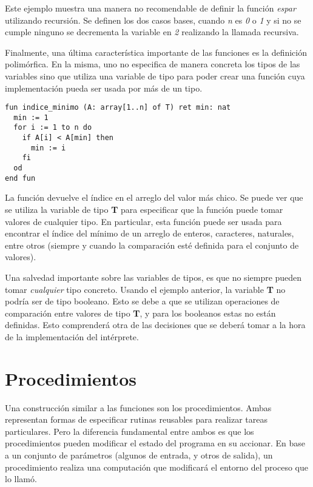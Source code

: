 \documentclass{article}
\begin{document}
Este ejemplo muestra una manera no recomendable de definir la función \textit{es\gbajo par} utilizando recursión.
Se definen los dos casos bases, cuando \textit{n} es \textit{0} o \textit{1} y si no se cumple ninguno se decrementa la variable en \textit{2} realizando la llamada recursiva.

Finalmente, una última característica importante de las funciones es la definición polimórfica.
En la misma, uno no especifica de manera concreta los tipos de las variables sino que utiliza una variable de tipo para poder crear una función cuya implementación pueda ser usada por más de un tipo.

\begin{lstlisting}
fun indice_minimo (A: array[1..n] of T) ret min: nat
  min := 1
  for i := 1 to n do
    if A[i] < A[min] then
      min := i
    fi
  od
end fun
\end{lstlisting}

La función devuelve el índice en el arreglo del valor más chico.
Se puede ver que se utiliza la variable de tipo \textbf{T} para especificar que la función puede tomar valores de cualquier tipo.
En particular, esta función puede ser usada para encontrar el índice del mínimo de un arreglo de enteros, caracteres, naturales, entre otros (siempre y cuando la comparación esté definida para el conjunto de valores).

Una salvedad importante sobre las variables de tipos, es que no siempre pueden tomar \textit{cualquier} tipo concreto.
Usando el ejemplo anterior, la variable \textbf{T} no podría ser de tipo booleano.
Esto se debe a que se utilizan operaciones de comparación entre valores de tipo \textbf{T}, y para los booleanos estas no están definidas.
Esto comprenderá otra de las decisiones que se deberá tomar a la hora de la implementación del intérprete.

\section{Procedimientos}

Una construcción similar a las funciones son los procedimientos.
Ambas representan formas de especificar rutinas reusables para realizar tareas particulares.
Pero la diferencia fundamental entre ambos es que los procedimientos pueden modificar el estado del programa en su accionar.
En base a un conjunto de parámetros (algunos de entrada, y otros de salida), un procedimiento realiza una computación que modificará el entorno del proceso que lo llamó.
\end{document}
